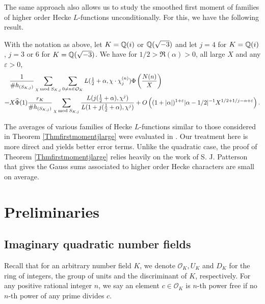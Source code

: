 \documentclass[twoside,leqno,10pt, A4]{amsart}
\begin{document}
  The same approach also allows us to study the smoothed first moment of families of higher order Hecke $L$-functions unconditionally. For
this, we have the following result.
\begin{theorem}
\label{Thmfirstmomentjlarge}
	With the notation as above, let $K=\mathbb Q(i)$ or $\mathbb Q(\sqrt{-3})$ and let $j=4$ for $K=\mathbb Q(i)$, $j=3$ or $6$ for $K=\mathbb Q(\sqrt{-3})$.  We have
for $1/2>\Re(\alpha)>0$, all large $X$ and any $\varepsilon>0$,
\begin{align} \label{FirstmomentSmoothedjlarge}
\begin{split}
&  \frac {1}{\#h_{(S_{K,j})}}\sum_{\chi \bmod {S_{K,j}}} \sum_{0 \neq n \in \mathcal O_K} L(\tfrac{1}{2}+\alpha, \chi \cdot \chi^{(n)}_{j})\Phi
\left( \frac {N(n)}X \right) \\
=&  X\widehat \Phi(1) \frac {r_K}{\#h_{(S_{K,j})}}\sum_{\chi \bmod {S_{K,j}}} \frac{L(j(\tfrac{1}{2}+\alpha), \chi^j)}{L(1+j(\tfrac{1}{2}+\alpha),
\chi^j)}+O\left((1+|\alpha|)^{1+\varepsilon}|\alpha-1/2|^{-1}  X^{1/2+1/j-\alpha+\varepsilon}\right).
\end{split}
\end{align}
\end{theorem}

The averages of various families of Hecke $L$-functions similar to those considered in Theorem \ref{Thmfirstmomentjlarge} were evaluated in \cites{FaHL, Luo, G&Zhao1, G&Zhao2023-4}. Our treatment here is more direct and yields better error terms. Unlike the quadratic case, the proof of Theorem \ref{Thmfirstmomentjlarge} relies heavily on the work of S. J. Patterson \cite{P} that gives the Gauss sums associated to higher order Hecke characters are small on average.


\section{Preliminaries}
\label{sec 2}

\subsection{Imaginary quadratic number fields}
\label{sect: Kronecker}

   Recall that for an arbitrary number field $K$, we denote $\mathcal{O}_K, U_K$ and $D_K$ for the ring of integers, the group of units and the discriminant of $K$, respectively. For any positive rational integer $n$, we say an element $c \in \mathcal{O}_K$ is $n$-th power free if no $n$-th power of any prime divides $c$. \newline
\end{document}
